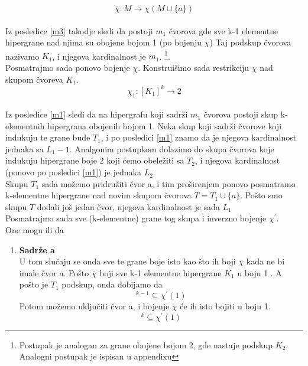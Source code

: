 \documentclass[a4paper]{article}
\begin{document}
\begin{description}
		\begin{equation}
			\overline{\chi}:M \rightarrow \chi (M \cup \{a\})
		\end{equation}
		\\
		Iz posledice \ref{m3} takodje sledi da postoji $m_1$ čvorova gde sve k-1 elementne hipergrane nad njima su obojene bojom 1 (po bojenju $\overline{\chi}$)
		Taj podskup čvorova nazivamo $K_1$, i njegova kardinalnost je  $m_1$. \footnote{Postupak je analogan za grane obojene bojom 2, gde nastaje podskup $K_2$. Analogni postupak je ispisan u appendixu}. \\
		Posmatrajmo sada ponovo bojenje $\chi$. Konstruišimo sada restrikciju $\chi$ nad  skupom čvoreva $K_1$.
		\begin{equation}
			\chi_1 : [ K_1 ]^k  \rightarrow \underline{2}
		\end{equation}\\
		Iz posledice \ref{m1} sledi da na hipergrafu koji sadrži $m_1$ čvorova postoji skup k-elementnih hipergrana obojenih bojom 1. Neka skup koji sadrži čvorove koji indukuju te grane bude $T_1$, i po posledici \ref{m1} znamo da je njegova kardinalnost jednaka sa $L_1 - 1$. Analgonim postupkom dolazimo do  skupa čvorova koje indukuju hipergrane boje 2 koji ćemo obeležiti sa $T_2$, i njegova kardinalnost (ponovo po posledici \ref{m1}) je jednaka $L_2$. \\
		Skupu $T_1$ sada možemo pridružiti čvor a, i tim proširenjem ponovo posmatramo k-elementne hipergrane nad novim skupom čvorova $T = T_1 \cup \{a\}$. Pošto smo skupu $T$ dodali još jedan čvor, njegova kardinalnost je sada $L_1$\\
		Posmatrajmo sada sve (k-elementne) grane tog skupa i inverzno bojenje $\chi^\prime$.\\
		One mogu ili da 
		\begin{enumerate}
			\item \textbf{Sadrže a}\\
				U tom slučaju se onda sve te grane boje isto kao što ih boji $\overline{\chi}$ kada ne bi imale čvor a. Pošto $\overline{\chi}$ boji sve k-1 elementne hipergrane $K_1$ u boju 1 . A pošto je $T_1$ podskup, onda dobijamo da 
				\begin{equation}
					[ T_1 ]^{k-1} \subseteq \chi^\prime (1)
				\end{equation}
				Potom možemo uključiti čvor a, i bojenje $\chi$ će ih isto bojiti u boju 1.
				\begin{equation}
					[ T_1 \cup \{a\} ]^{k} \subseteq \chi^\prime (1)
				\end{equation}

\end{enumerate}
\end{description}
\end{document}

